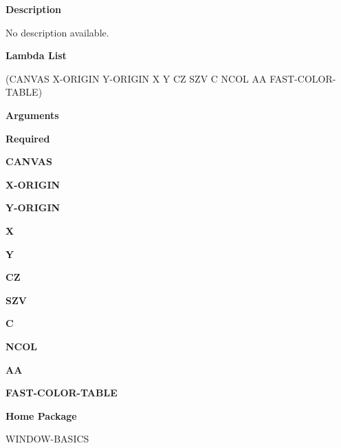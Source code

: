  
{\bf Description}

No description available.

 
{\bf Lambda List}

(CANVAS X-ORIGIN Y-ORIGIN X Y CZ SZV C NCOL AA FAST-COLOR-TABLE)

 
{\bf Arguments}


\beginhang
{\bf Required}\hspace{2em}
 
{\bf CANVAS}


 
{\bf X-ORIGIN}


 
{\bf Y-ORIGIN}


 
{\bf X}


 
{\bf Y}


 
{\bf CZ}


 
{\bf SZV}


 
{\bf C}


 
{\bf NCOL}


 
{\bf AA}


 
{\bf FAST-COLOR-TABLE}


 
\endhang
 
{\bf Home Package}

WINDOW-BASICS

